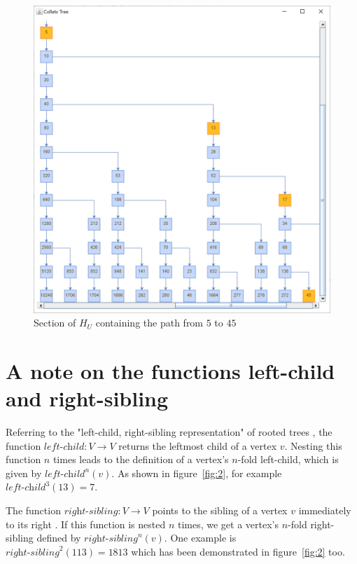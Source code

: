 \begin{figure}[H]
	\includegraphics[width=1.00\textwidth]{figures/h_u.png}
	\caption{Section of $H_U$ containing the path from $5$ to $45$}
	\label{fig:3}
\end{figure}

\section{A note on the functions left-child and right-sibling}
Referring to the "left-child, right-sibling representation" of rooted trees \cite[p.~246]{Ref_Cormen_Leiserson_Rivest_Stein}, the function $\textit{left-child}:V\rightarrow V$ returns the leftmost child of a vertex $v$. Nesting this function $n$ times leads to the definition of a vertex's $n$-fold left-child, which is given by $\textit{left-child}^n(v)$. As shown in figure~\ref{fig:2}, for example $\textit{left-child}^3(13)=7$.

The function $\textit{right-sibling}:V\rightarrow V$ points to the sibling of a vertex $v$ immediately to its right \cite[p.~246]{Ref_Cormen_Leiserson_Rivest_Stein}. If this function is nested $n$ times, we get a vertex's $n$-fold right-sibling defined by $\textit{right-sibling}^n(v)$. One example is $\textit{right-sibling}^2(113)=1813$ which has been demonstrated in figure~\ref{fig:2} too.

